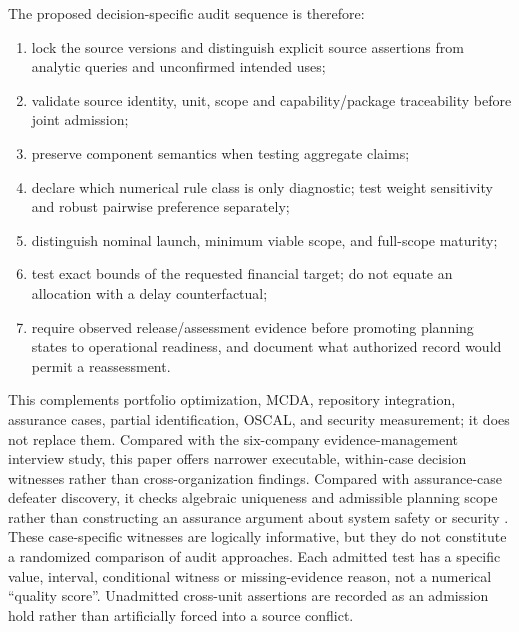 \documentclass[systems,article,submit,moreauthors]{Definitions/mdpi}
\begin{document}
The proposed decision-specific audit sequence is therefore:
\begin{enumerate}[leftmargin=1.5em]
\item lock the source versions and distinguish explicit source assertions from analytic queries and unconfirmed intended uses;
\item validate source identity, unit, scope and capability/package traceability before joint admission;
\item preserve component semantics when testing aggregate claims;
\item declare which numerical rule class is only diagnostic; test weight sensitivity and robust pairwise preference separately;
\item distinguish nominal launch, minimum viable scope, and full-scope maturity;
\item test exact bounds of the requested financial target; do not equate an allocation with a delay counterfactual;
\item require observed release/assessment evidence before promoting planning states to operational readiness, and document what authorized record would permit a reassessment.
\end{enumerate}
This complements portfolio optimization, MCDA, repository integration, assurance cases, partial identification, OSCAL, and security measurement; it does not replace them. Compared with the six-company evidence-management interview study, this paper offers narrower executable, within-case decision witnesses rather than cross-organization findings. Compared with assurance-case defeater discovery, it checks algebraic uniqueness and admissible planning scope rather than constructing an assurance argument about system safety or security \cite{MohamadEvidence2024,Viger2026}. These case-specific witnesses are logically informative, but they do not constitute a randomized comparison of audit approaches. Each admitted test has a specific value, interval, conditional witness or missing-evidence reason, not a numerical ``quality score''. Unadmitted cross-unit assertions are recorded as an admission hold rather than artificially forced into a source conflict.
\end{document}
